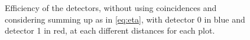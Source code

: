 \begin{figure}[H]
\begin{minipage}[c]{0.35\linewidth}
	 \label{fig:nocoinc_20} 
	\end{minipage}
	\caption{Efficiency of the detectors, without using coincidences and considering summing up as in \ref{eq:eta}, with detector 0 in blue and detector 1 in red, at each different distances for each plot.}
    \label{fig:eff_nocoinc3}
	\end{figure}



